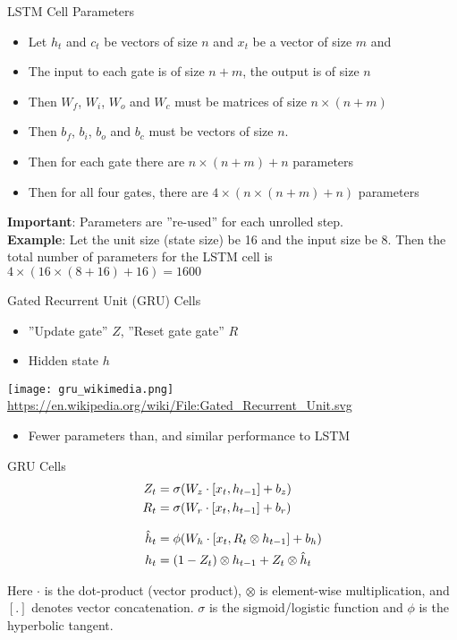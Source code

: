 \documentclass[ignorenonframetext,xcolor=x11names]{beamer}
\begin{document}
\begin{frame}{LSTM Cell Parameters}
\small
\begin{itemize}
  \item Let $h_t$ and $c_t$ be vectors of size $n$ and $x_t$ be a vector of size $m$ and 
  \item The input to each gate is of size $n+m$, the output is of size $n$
  \item Then $W_f$, $W_i$, $W_o$ and $W_c$ must be matrices of size $n \times (n+m)$
  \item Then $b_f$, $b_i$, $b_o$ and $b_c$ must be vectors of size $n$. 
  \item Then for each gate there are $n \times (n+m) + n$ parameters
  \item Then for all four gates, there are $4 \times (n \times (n+m) + n)$ parameters
\end{itemize}
\textbf{Important}: Parameters are ''re-used'' for each unrolled step.\\

\textbf{Example}: Let the unit size (state size) be 16 and the input size be 8. Then the total number of parameters for the LSTM cell is $4 \times (16 \times (8+16) + 16) = 1600$
\end{frame}

\begin{frame}{Gated Recurrent Unit (GRU) Cells}
\begin{itemize}
   \item ''Update gate'' $Z$, ''Reset gate gate'' $R$
   \item Hidden state $h$
\end{itemize}
\begin{center}
\texttt{[image: gru\_wikimedia.png]}
\scriptsize \url{https://en.wikipedia.org/wiki/File:Gated_Recurrent_Unit.svg} \normalsize
\end{center}
\begin{itemize}
   \item Fewer parameters than, and similar performance to LSTM
\end{itemize}
\end{frame}

\begin{frame}{GRU Cells}
\begin{align*}
Z_t &= \sigma (W_z \cdot [x_t, h_{t-1}] + b_z) \\
R_t &= \sigma (W_r \cdot [x_t, h_{t-1}] + b_r) \\[.5\baselineskip]
\hat{h}_t &= \phi (W_h \cdot [x_t, R_t \otimes h_{t-1}] + b_h) \\
h_t &= (1 - Z_t) \otimes h_{t-1} + Z_t \otimes \hat{h}_t
\end{align*}

\small
Here $\cdot$ is the dot-product (vector product), $\otimes$ is element-wise multiplication, and $[.]$ denotes vector concatenation.  $\sigma$ is the sigmoid/logistic function and $\phi$ is the hyperbolic tangent.
\end{frame}
\end{document}
